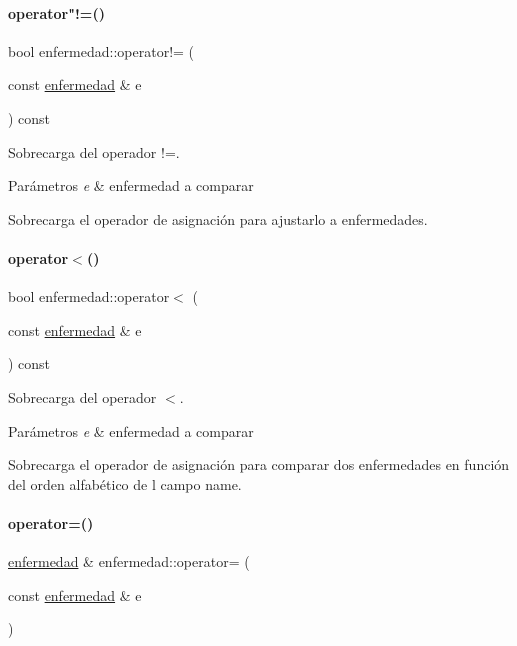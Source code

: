 \paragraph{\texorpdfstring{operator"!=()}{operator!=()}}
{\footnotesize\ttfamily bool enfermedad\+::operator!= (\begin{DoxyParamCaption}\item[{const \hyperlink{classenfermedad}{enfermedad} \&}]{e }\end{DoxyParamCaption}) const}



Sobrecarga del operador !=. 


\begin{DoxyParams}{Parámetros}
{\em e} & enfermedad a comparar\\
\hline
\end{DoxyParams}
Sobrecarga el operador de asignación para ajustarlo a enfermedades. \hypertarget{classenfermedad_a0b532e9e14c36ca4431cf50620c871ed}{}\label{classenfermedad_a0b532e9e14c36ca4431cf50620c871ed} 
\paragraph{\texorpdfstring{operator$<$()}{operator<()}}
{\footnotesize\ttfamily bool enfermedad\+::operator$<$ (\begin{DoxyParamCaption}\item[{const \hyperlink{classenfermedad}{enfermedad} \&}]{e }\end{DoxyParamCaption}) const}



Sobrecarga del operador $<$. 


\begin{DoxyParams}{Parámetros}
{\em e} & enfermedad a comparar\\
\hline
\end{DoxyParams}
Sobrecarga el operador de asignación para comparar dos enfermedades en función del orden alfabético de l campo name. \hypertarget{classenfermedad_a795be16b7e3e6a858211ff20a62c9d85}{}\label{classenfermedad_a795be16b7e3e6a858211ff20a62c9d85} 
\paragraph{\texorpdfstring{operator=()}{operator=()}}
{\footnotesize\ttfamily \hyperlink{classenfermedad}{enfermedad} \& enfermedad\+::operator= (\begin{DoxyParamCaption}\item[{const \hyperlink{classenfermedad}{enfermedad} \&}]{e }\end{DoxyParamCaption})}



